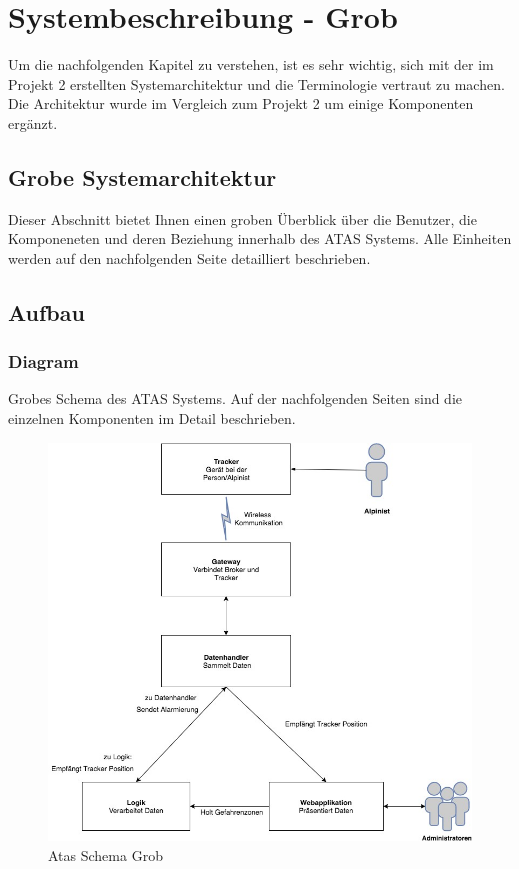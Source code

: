 \documentclass[11pt,english,german]{report}
\theoremstyle{definition}
\begin{document}
\chapter{Systembeschreibung - Grob}
Um die nachfolgenden Kapitel zu verstehen, ist es sehr wichtig, sich mit der im Projekt 2 erstellten Systemarchitektur und die Terminologie vertraut zu machen. Die Architektur wurde im Vergleich zum Projekt 2 um einige Komponenten ergänzt.

\section{Grobe Systemarchitektur}
Dieser Abschnitt bietet Ihnen einen groben Überblick über die Benutzer, die Komponeneten und deren Beziehung innerhalb des ATAS Systems. Alle Einheiten werden auf den nachfolgenden Seite detailliert beschrieben.

\newpage
\section{Aufbau}
\subsection{Diagram}
Grobes Schema des ATAS Systems. Auf der nachfolgenden Seiten sind die einzelnen Komponenten im Detail beschrieben.\\[0.3cm]
\begin{figure}[H]
	\centering
	\includegraphics[width=\textwidth]{img/system/ATAS_SystemOverview_Abstract_BA.jpg}
	\caption[Atas Schema Grob]
	{Atas Schema Grob}
\end{figure}
\end{document}
